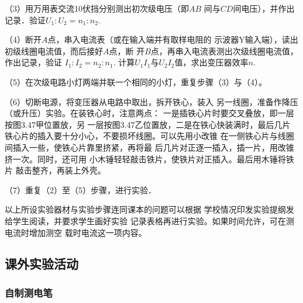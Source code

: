 （3）用万用表交流10伏挡分别测出初次级电压（即$AB$
间与$CD$间电压），并作出记录．验证$U_1:U_2=n_1:n_2$.

（4）断开$A$点，串入电流表（或在输入端并有取样电阻的
示波器Y输入端），读出初级线圈电流值，而后接好$A$点，断
开$B$点，再串入电流表测出次级线圈电流值，作出记录，验证
$I_1:I_2=n_2:n_1$. 计算$U_1I_1$与$U_2I_2$值，求出变压器效率$n$.

（5）在次级电路小灯两端并联一个相同的小灯，重复步骤（3）与（4）。

（6）切断电源，将变压器从电路中取出，拆开铁心，装入
另一线圈，准备作降压（或升压）实验。在装铁心时，注意两点：
一是插铁心片时要交叉叠放，即一层按图3.47甲位置放，另
一层按图3.47乙位置放，二是在铁心快装满时，最后几片
铁心片的插入要十分小心，不要损坏线圈。可以先用小改锥
在一侧铁心片与线圈间插入一些，使铁心片靠里挤紧，再将最
后几片对正逐一插入，插一片，用改锥挤一次。同时，还可用
小木锤轻轻敲击铁片，使铁片对正插入。最后用木锤将铁片
敲击整齐，再装上外壳。

\begin{figure}[htp]
    \centering
    \caption{}
\end{figure}

（7）重复（2）至（5）步骤，进行实验．

以上所设实验器材与实验步骤连同课本的问题可以根据
学校情况印发实验提纲发给学生阅读，并要求学生画好实验
记录表格再进行实验。如果时间允许，可在测电流时增加测空
载时电流这一项内容。

\subsection{课外实验活动}
\subsubsection{自制测电笔}

